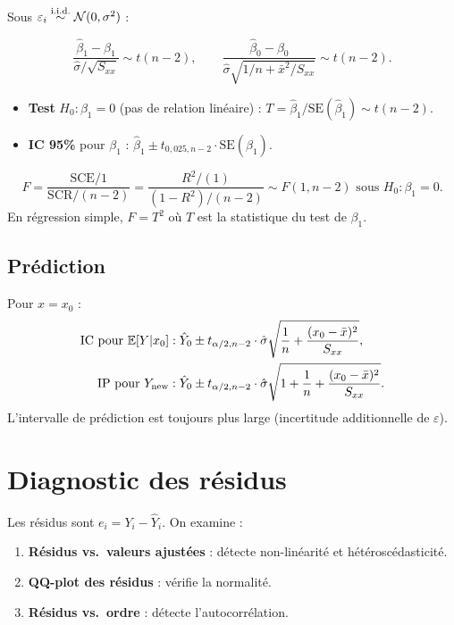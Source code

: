 Sous $\varepsilon_i\overset{\text{i.i.d.}}{\sim}\mathcal{N}(0,\sigma^2)$ :

\begin{theoreme}
\[
\frac{\hat{\beta}_1-\beta_1}{\hat{\sigma}/\sqrt{S_{xx}}} \sim t(n-2), \qquad
\frac{\hat{\beta}_0-\beta_0}{\hat{\sigma}\sqrt{1/n+\bar{x}^2/S_{xx}}} \sim t(n-2).
\]
\begin{itemize}
\item \textbf{Test} $H_0:\beta_1=0$ (pas de relation lin\'eaire) : $T=\hat{\beta}_1/\mathrm{SE}(\hat{\beta}_1)\sim t(n-2)$.
\item \textbf{IC 95\%} pour $\beta_1$ : $\hat{\beta}_1\pm t_{0{,}025,n-2}\cdot\mathrm{SE}(\hat{\beta}_1)$.
\end{itemize}
\end{theoreme}

\begin{theoreme}
\[
F = \frac{\mathrm{SCE}/1}{\mathrm{SCR}/(n-2)} = \frac{R^2/(1)}{(1-R^2)/(n-2)} \sim F(1,n-2) \text{ sous } H_0:\beta_1=0.
\]
En r\'egression simple, $F=T^2$ o\`u $T$ est la statistique du test de $\beta_1$.
\end{theoreme}

\subsection{Pr\'ediction}

\begin{definition}
Pour $x=x_0$ :
\begin{align}
\text{IC pour } \mathbb{E}[Y|x_0] &: \hat{Y}_0\pm t_{\alpha/2,n-2}\cdot\hat{\sigma}\sqrt{\frac{1}{n}+\frac{(x_0-\bar{x})^2}{S_{xx}}}, \\
\text{IP pour } Y_{\mathrm{new}} &: \hat{Y}_0\pm t_{\alpha/2,n-2}\cdot\hat{\sigma}\sqrt{1+\frac{1}{n}+\frac{(x_0-\bar{x})^2}{S_{xx}}}.
\end{align}
L'intervalle de pr\'ediction est toujours plus large (incertitude additionnelle de $\varepsilon$).
\end{definition}

\section{Diagnostic des r\'esidus}

\begin{definition}[R\'esidus]
Les r\'esidus sont $e_i=Y_i-\hat{Y}_i$. On examine :
\begin{enumerate}
\item \textbf{R\'esidus vs.\ valeurs ajust\'ees} : d\'etecte non-lin\'earit\'e et h\'et\'erosc\'edasticit\'e.
\item \textbf{QQ-plot des r\'esidus} : v\'erifie la normalit\'e.
\item \textbf{R\'esidus vs.\ ordre} : d\'etecte l'autocorr\'elation.
\end{enumerate}
\end{definition}

